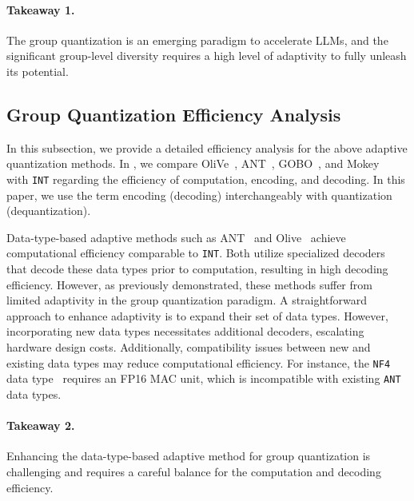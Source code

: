\paragraph{Takeaway 1.} The group quantization is an emerging paradigm to accelerate LLMs, and the significant group-level diversity requires a high level of adaptivity to fully unleash its potential.

\subsection{Group Quantization Efficiency Analysis}
\label{subsec:efficiency}


In this subsection, we provide a detailed efficiency analysis for the above adaptive quantization methods.
In , we compare OliVe~\cite{guo2023olive}, ANT~\cite{guo2022ant}, GOBO~\cite{zadeh2020gobo}, and Mokey~\cite{zadeh2022mokey} with \texttt{INT} regarding the efficiency of computation, encoding, and decoding. 
In this paper, we use the term encoding (decoding) interchangeably with quantization (dequantization).
 

Data-type-based adaptive methods such as ANT~\cite{guo2022ant} and Olive~\cite{guo2023olive} achieve computational efficiency comparable to \texttt{INT}. 
Both utilize specialized decoders that decode these data types prior to computation, resulting in high decoding efficiency. 
However, as previously demonstrated, these methods suffer from limited adaptivity in the group quantization paradigm. 
A straightforward approach to enhance adaptivity is to expand their set of data types. 
However, incorporating new data types necessitates additional decoders, escalating hardware design costs. 
Additionally, compatibility issues between new and existing data types may reduce computational efficiency. 
For instance, the \texttt{NF4} data type~\cite{dettmers2023qlora} requires an FP16 MAC unit, which is incompatible with existing \texttt{ANT} data types.


\paragraph{Takeaway 2.} Enhancing the data-type-based adaptive method for group quantization is challenging and requires a careful balance for the computation and decoding efficiency.

